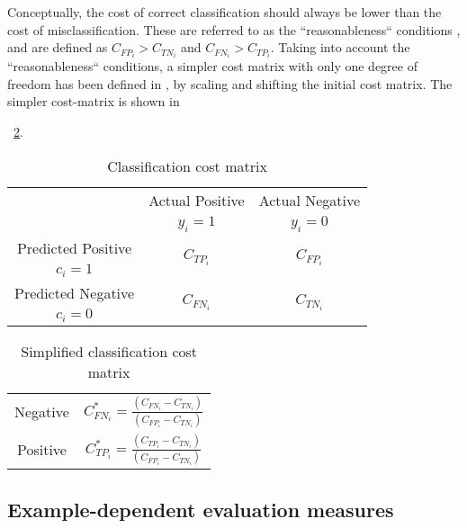 {Conceptually, the cost of correct classification should always be lower than the cost of  
misclassification. These are referred to as the ``reasonableness`` conditions \citep{Elkan2001},   
and are defined as  $C_{FP_i} > C_{TN_i}$ and $C_{FN_i} > C_{TP_i}$.  Taking into account the 
``reasonableness`` conditions, a simpler cost matrix   with only one degree of freedom has been 
defined in \citep{Elkan2001}, by scaling and shifting the initial cost matrix. The simpler
cost-matrix is shown in \tablename{~\ref{tab:3:sim_cost_mat}.

\begin{table}[t]
    \centering
    \footnotesize
    \begin{tabular}{c|c|c}
      \multicolumn{1}{c|}{}  & Actual Positive& Actual Negative \\
      \multicolumn{1}{c|}{} & $y_i=1$& $y_i=0$ \\
      \hline
      Predicted Positive    & \multirow{ 2}{*}{$C_{TP_i}$} & \multirow{ 2}{*}{$C_{FP_i}$} \\
      $c_i=1$ & &\\
      \hline
      Predicted Negative    & \multirow{ 2}{*}{$C_{FN_i}$} & \multirow{ 2}{*}{$C_{TN_i}$} \\
      $c_i=0$ & &\\
    \end{tabular}
    \caption{Classification cost matrix}
    \label{tab:3:cost_matrix}
\end{table}  

 
\begin{table}[t]
  \centering
  \footnotesize    \begin{tabular}{c|c}
  \multirow{ 2}{*}{Negative} & \multirow{ 
  2}{*}{$C^*_{FN_i}=\frac{(C_{FN_i}-C_{TN_i})}{(C_{FP_i}-C_{TN_i})}$} \\
  \\
  \hline
  \multirow{ 2}{*}{Positive} & \multirow{ 
  2}{*}{$C^*_{TP_i}=\frac{(C_{TP_i}-C_{TN_i})}{(C_{FP_i}-C_{TN_i})}$} \\
  \\ 
  \end{tabular}
  \caption{Simplified classification cost matrix \citep{Elkan2001}}
  \label{tab:3:sim_cost_mat}
\end{table}  


\subsection{Example-dependent evaluation measures}
\label{sec:3:csmeasures}

}}

